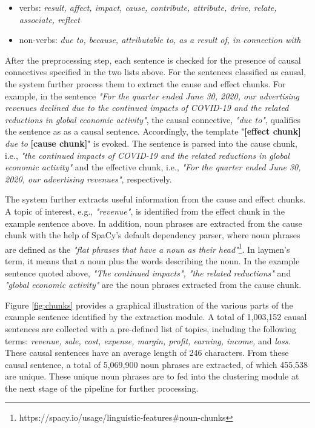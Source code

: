 \begin{itemize}
\item	verbs: \emph{result, affect, impact, cause, contribute, attribute, drive, relate, associate, reflect}
\item	non-verbs: \emph{due to, because, attributable to, as a result of, in connection with}
\end{itemize}

After the preprocessing step, each sentence is checked for the presence of causal connectives specified in the two lists above. For the sentences classified as causal, the system further process them to extract the cause and effect chunks. For example, in the sentence \emph{"For the quarter ended June 30, 2020, our advertising revenues declined due to the continued impacts of COVID-19 and the related reductions in global economic activity"}, the causal connective, \emph{"due to"}, qualifies the sentence as as a causal sentence. Accordingly, the template "\textbf{[effect chunk]} \emph{due to} \textbf{[cause chunk]}" is evoked. The sentence is parsed into the cause chunk, i.e., \emph{"the continued impacts of COVID-19 and the related reductions in global economic activity"} and the effective chunk, i.e., \emph{"For the quarter ended June 30, 2020, our advertising revenues"}, respectively. 

The system further extracts useful information from the cause and effect chunks. A topic of interest, e.g., \emph{"revenue"}, is identified from the effect chunk in the example sentence above. In addition,  noun phrases are extracted from the cause chunk with the help of SpaCy's default dependency parser, where noun phrases are defined as the \emph{"flat phrases that have a noun as their head"}\footnote{ https://spacy.io/usage/linguistic-features\#noun-chunks}. In laymen's term, it means that a noun plus the words describing the noun. In the example sentence quoted above, \emph{"The continued impacts", "the related reductions"} and \emph{"global economic activity"} are the noun phrases extracted from the cause chunk. 

Figure \ref{fig:chunks} provides a graphical illustration of the various parts of the example sentence identified by the extraction module. A total of 1,003,152 causal sentences are collected with a pre-defined list of topics, including the following terms: \emph{revenue, sale, cost, expense, margin, profit, earning, income,} and \emph{loss}. These causal sentences have an average length of 246 characters. From these causal sentence, a total of 5,069,900 noun phrases are extracted, of which 455,538 are unique. These unique noun phrases are to fed into the clustering module at the next stage of the pipeline for further processing.  

